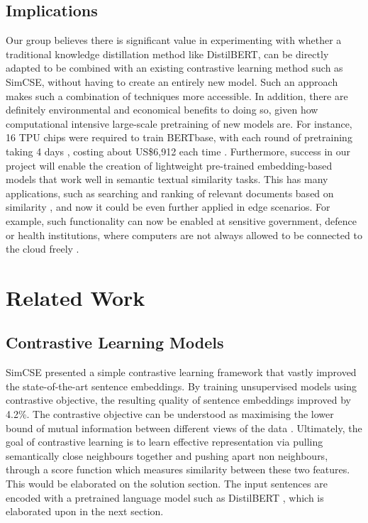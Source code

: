 \documentclass[10pt,twocolumn,letterpaper]{article}
\begin{document}
\subsection{Implications}

Our group believes there is significant value in experimenting with whether a traditional knowledge distillation method like DistilBERT, can be directly adapted to be combined with an existing contrastive learning method such as SimCSE, without having to create an entirely new model. Such an approach makes such a combination of techniques more accessible. In addition, there are definitely environmental and economical benefits to doing so, given how computational intensive large-scale pretraining of new models are. For instance, 16 TPU chips were required to train BERTbase, with each round of pretraining taking 4 days \cite{1810.04805}, costing about US\$6,912 each time \cite{cost.sota.ai}. Furthermore, success in our project will enable the creation of lightweight pre-trained embedding-based models that work well in semantic textual similarity tasks. This has many applications, such as searching and ranking of relevant documents based on similarity \cite{robust.sts}, and now it could be even further applied in edge scenarios. For example, such functionality can now be enabled at sensitive government, defence or health institutions, where computers are not always allowed to be connected to the cloud freely \cite{1910.01108}.

\section{Related Work}

\subsection{Contrastive Learning Models}

SimCSE \cite{2104.08821} presented a simple contrastive learning framework that vastly improved the state-of-the-art sentence embeddings. By training unsupervised models using contrastive objective, the resulting quality of sentence embeddings improved by 4.2\%. The contrastive objective can be understood as maximising the lower bound of mutual information between different views of the data \cite{1808.06670}. Ultimately, the goal of contrastive learning is to learn effective representation via pulling semantically close neighbours together and pushing apart  non neighbours,  through a score function which measures similarity between these two features. This would be elaborated on the solution section. The input sentences are encoded with a pretrained language model such as DistilBERT , which is elaborated upon in the next section.
\end{document}
